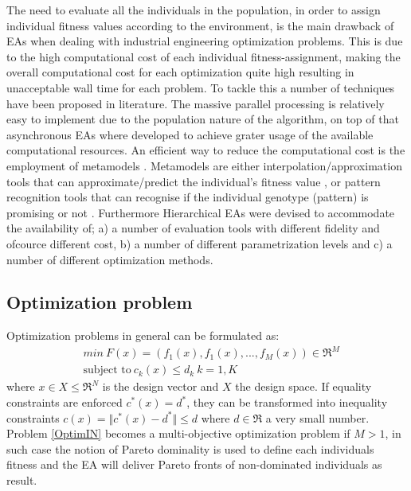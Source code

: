 The need to evaluate all the individuals in the population, in order to assign individual fitness values according to the environment, is the main drawback of EAs when dealing with industrial engineering optimization problems. This is due to the high computational cost of each individual fitness-assignment, making the overall computational cost for each optimization quite high resulting in unacceptable wall time for each problem. To tackle this a number of techniques have been proposed in literature. The massive parallel processing is relatively easy to implement due to the population nature of the algorithm, on top of that asynchronous EAs \cite{LTT_2_040} where developed to achieve grater usage of the available computational resources.  An efficient way to reduce the computational cost is the employment of metamodels \cite{EBNK,KCGVKI04}. Metamodels are either interpolation/approximation tools that can approximate/predict the individual's fitness value \cite{LTT_4_05,LTT_2_029}, or pattern recognition tools that can recognise if the individual genotype (pattern) is promising or not \cite{KCGVKI00a,KCGVKI00b}. Furthermore Hierarchical EAs \cite{LTT_2_044} were devised to accommodate the availability of; a) a number of evaluation tools with different fidelity and ofcource different cost, b) a number of different parametrization levels and c) a number of different optimization methods.      


\subsection{Optimization problem}
Optimization problems in general can be formulated as:
\begin{align} 
   &min ~ F(x)=(f_1(x),f_1(x),...,f_M(x))\in \Re^{M} \nonumber \\
   &\mbox{subject to} ~ c_k(x)\leq d_k ~ k =1,K
\label{OptimIN}
\end{align}
where $x\in X \!\leq\! \Re^{N}$ is the design vector and $X$ the design space. If equality constraints are enforced $ c^*(x)=d^* $, they can be transformed into inequality constraints $ c(x)=\Vert c^*(x)-d^*\Vert \leq d $ where $ d \in \Re $ a very small number.  Problem \ref{OptimIN} becomes a multi-objective optimization problem if $M \!> \!1$, in such case the notion of Pareto dominality \cite{Zitzler2000} is used to define each individuals fitness and the EA will deliver Pareto fronts of non-dominated individuals as result. 

